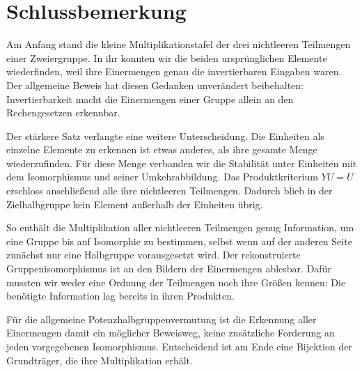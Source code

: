 \par{}
\section*{Schlussbemerkung}
\hypertarget{reconstruction.reading.conclusion}{}

Am Anfang stand die kleine Multiplikationstafel der drei
nichtleeren Teilmengen einer Zweiergruppe. In ihr konnten
wir die beiden ursprünglichen Elemente wiederfinden, weil
ihre Einermengen genau die invertierbaren Eingaben waren.
Der allgemeine Beweis hat diesen Gedanken unverändert
beibehalten: Invertierbarkeit macht die Einermengen einer
Gruppe allein an den Rechengesetzen erkennbar.

Der stärkere Satz verlangte eine weitere Unterscheidung.
Die Einheiten als einzelne Elemente zu erkennen ist etwas
anderes, als ihre gesamte Menge wiederzufinden. Für diese
Menge verbanden wir die Stabilität unter Einheiten mit
dem Isomorphismus und seiner Umkehrabbildung. Das
Produktkriterium \(YU=U\) erschloss anschließend alle ihre
nichtleeren Teilmengen. Dadurch blieb in der Zielhalbgruppe
kein Element außerhalb der Einheiten übrig.

So enthält die Multiplikation aller nichtleeren Teilmengen
genug Information, um eine Gruppe bis auf Isomorphie zu
bestimmen, selbst wenn auf der anderen Seite zunächst nur
eine Halbgruppe vorausgesetzt wird. Der rekonstruierte
Gruppenisomorphismus ist an den Bildern der Einermengen
ablesbar. Dafür mussten wir weder eine Ordnung der
Teilmengen noch ihre Größen kennen: Die benötigte
Information lag bereits in ihren Produkten.

Für die allgemeine Potenzhalbgruppenvermutung ist die
Erkennung aller Einermengen damit ein möglicher Beweisweg,
keine zusätzliche Forderung an jeden vorgegebenen
Isomorphismus. Entscheidend ist am Ende eine Bijektion
der Grundträger, die ihre Multiplikation erhält.
